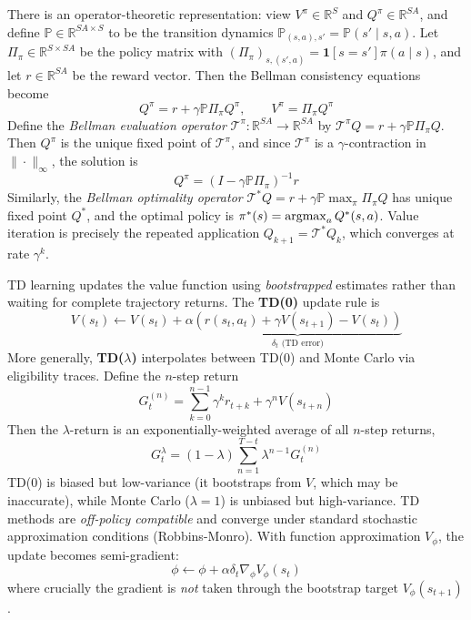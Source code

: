 \documentclass[11pt, letterpaper]{article}
\begin{document}
\begin{remark}
    There is an operator-theoretic representation: view \(V^\pi \in \mathbb{R}^S\) and \(Q^\pi \in \mathbb{R}^{SA}\), and define \(\mathbb{P} \in \mathbb{R}^{SA \times S}\) to be the transition dynamics \(\mathbb{P}_{(s,a), s'} = \mathbb{P}(s' \mid s, a)\). Let \(\Pi_\pi \in \mathbb{R}^{S \times SA}\) be the policy matrix with \((\Pi_\pi)_{s,(s',a)} = \mathbf{1}[s = s'] \pi(a \mid s)\), and let \(r \in \mathbb{R}^{SA}\) be the reward vector. Then the Bellman consistency equations become
    \[
        Q^\pi = r + \gamma \mathbb{P} \Pi_\pi Q^\pi, \qquad V^\pi = \Pi_\pi Q^\pi
    \]
    Define the \textit{Bellman evaluation operator} \(\mathcal{T}^\pi : \mathbb{R}^{SA} \to \mathbb{R}^{SA}\) by \(\mathcal{T}^\pi Q = r + \gamma \mathbb{P} \Pi_\pi Q\). Then \(Q^\pi\) is the unique fixed point of \(\mathcal{T}^\pi\), and since \(\mathcal{T}^\pi\) is a \(\gamma\)-contraction in \(\|\cdot\|_\infty\), the solution is
    \[
        Q^\pi = (I - \gamma \mathbb{P}\Pi_\pi)^{-1} r
    \]
    Similarly, the \textit{Bellman optimality operator} \(\mathcal{T}^* Q = r + \gamma \mathbb{P} \max_\pi \Pi_\pi Q\) has unique fixed point \(Q^*\), and the optimal policy is \(\pi^*(s) = \operatorname*{argmax}_a Q^*(s,a)\). Value iteration is precisely the repeated application \(Q_{k+1} = \mathcal{T}^* Q_k\), which converges at rate \(\gamma^k\).
\end{remark}

\begin{concept}
    TD learning updates the value function using \textit{bootstrapped} estimates rather than waiting for complete trajectory returns. The \textbf{TD(0)} update rule is
    \[
        V(s_t) \leftarrow V(s_t) + \alpha \underbrace{\left(r(s_t, a_t) + \gamma V(s_{t+1}) - V(s_t)\right)}_{\delta_t \text{ (TD error)}}
    \]
    More generally, \textbf{TD(\(\lambda\))} interpolates between TD(0) and Monte Carlo via eligibility traces. Define the \(n\)-step return
    \[
        G_t^{(n)} = \sum_{k=0}^{n-1} \gamma^k r_{t+k} + \gamma^n V(s_{t+n})
    \]
    Then the \(\lambda\)-return is an exponentially-weighted average of all \(n\)-step returns,
    \[
        G_t^\lambda = (1 - \lambda) \sum_{n=1}^{T-t} \lambda^{n-1} G_t^{(n)}
    \]
    TD(0) is biased but low-variance (it bootstraps from \(V\), which may be inaccurate), while Monte Carlo (\(\lambda = 1\)) is unbiased but high-variance. TD methods are \textit{off-policy compatible} and converge under standard stochastic approximation conditions (Robbins-Monro). With function approximation \(V_\phi\), the update becomes semi-gradient:
    \[
        \phi \leftarrow \phi + \alpha \delta_t \nabla_\phi V_\phi(s_t)
    \]
    where crucially the gradient is \textit{not} taken through the bootstrap target \(V_\phi(s_{t+1})\).
\end{concept}
\end{document}
